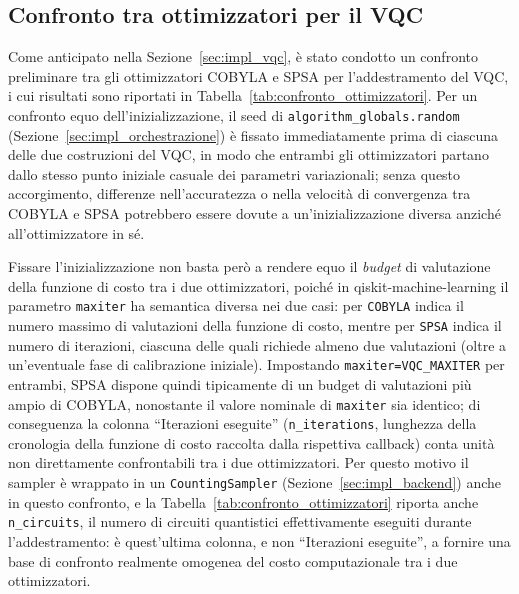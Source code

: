\subsection{Confronto tra ottimizzatori per il VQC}
\label{sec:confronto_ottimizzatori}

Come anticipato nella Sezione~\ref{sec:impl_vqc}, è stato condotto un confronto preliminare tra gli ottimizzatori COBYLA e SPSA per l'addestramento del VQC, i cui risultati sono riportati in Tabella~\ref{tab:confronto_ottimizzatori}. Per un confronto equo dell'inizializzazione, il seed di \texttt{algorithm\_globals.random} (Sezione~\ref{sec:impl_orchestrazione}) è fissato immediatamente prima di ciascuna delle due costruzioni del VQC, in modo che entrambi gli ottimizzatori partano dallo stesso punto iniziale casuale dei parametri variazionali; senza questo accorgimento, differenze nell'accuratezza o nella velocità di convergenza tra COBYLA e SPSA potrebbero essere dovute a un'inizializzazione diversa anziché all'ottimizzatore in sé.

Fissare l'inizializzazione non basta però a rendere equo il \emph{budget} di valutazione della funzione di costo tra i due ottimizzatori, poiché in qiskit-machine-learning il parametro \texttt{maxiter} ha semantica diversa nei due casi: per \texttt{COBYLA} indica il numero massimo di valutazioni della funzione di costo, mentre per \texttt{SPSA} indica il numero di iterazioni, ciascuna delle quali richiede almeno due valutazioni (oltre a un'eventuale fase di calibrazione iniziale). Impostando \newline\texttt{maxiter=VQC\_MAXITER} per entrambi, SPSA dispone quindi tipicamente di un budget di valutazioni più ampio di COBYLA, nonostante il valore nominale di \texttt{maxiter} sia identico; di conseguenza la colonna ``Iterazioni eseguite'' (\texttt{n\_iterations}, lunghezza della cronologia della funzione di costo raccolta dalla rispettiva callback) conta unità non direttamente confrontabili tra i due ottimizzatori. Per questo motivo il sampler è wrappato in un \texttt{CountingSampler} (Sezione~\ref{sec:impl_backend}) anche in questo confronto, e la Tabella~\ref{tab:confronto_ottimizzatori} riporta anche \texttt{n\_circuits}, il numero di circuiti quantistici effettivamente eseguiti durante l'addestramento: è quest'ultima colonna, e non ``Iterazioni eseguite'', a fornire una base di confronto realmente omogenea del costo computazionale tra i due ottimizzatori.

